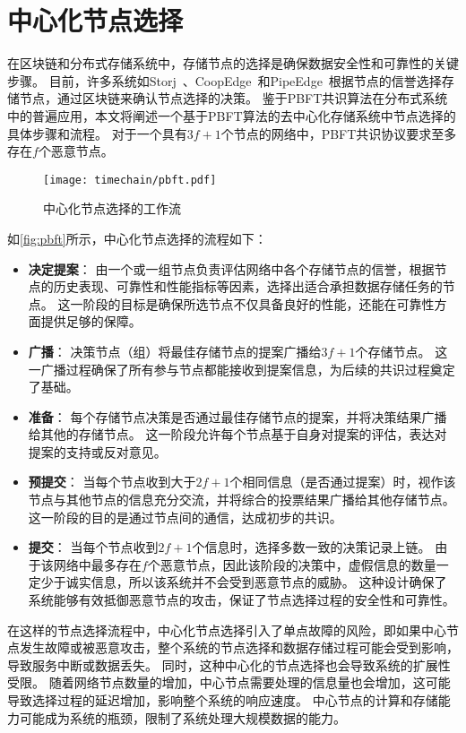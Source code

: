 \section{中心化节点选择}
在区块链和分布式存储系统中，存储节点的选择是确保数据安全性和可靠性的关键步骤。
目前，许多系统如Storj~\cite{storj2018storj}、CoopEdge~\cite{yuan2021coopedge}和PipeEdge~\cite{yuan2023pipeedge}根据节点的信誉选择存储节点，通过区块链来确认节点选择的决策。
鉴于PBFT共识算法在分布式系统中的普遍应用，本文将阐述一个基于PBFT算法的去中心化存储系统中节点选择的具体步骤和流程。
对于一个具有$3f+1$个节点的网络中，PBFT共识协议要求至多存在$f$个恶意节点。

\begin{figure}[t]
    \centering
    \texttt{[image: timechain/pbft.pdf]}
    \caption{中心化节点选择的工作流}
    \label{fig:pbft}
\end{figure}

如\autoref{fig:pbft}所示，中心化节点选择的流程如下：
\begin{itemize}
    \item \textbf{决定提案}：
    由一个或一组节点负责评估网络中各个存储节点的信誉，根据节点的历史表现、可靠性和性能指标等因素，选择出适合承担数据存储任务的节点。
    这一阶段的目标是确保所选节点不仅具备良好的性能，还能在可靠性方面提供足够的保障。
    \item \textbf{广播}：
    决策节点（组）将最佳存储节点的提案广播给$3f+1$个存储节点。
    这一广播过程确保了所有参与节点都能接收到提案信息，为后续的共识过程奠定了基础。
    \item \textbf{准备}：
    每个存储节点决策是否通过最佳存储节点的提案，并将决策结果广播给其他的存储节点。
    这一阶段允许每个节点基于自身对提案的评估，表达对提案的支持或反对意见。
    \item \textbf{预提交}：
    当每个节点收到大于$2f+1$个相同信息（是否通过提案）时，视作该节点与其他节点的信息充分交流，并将综合的投票结果广播给其他存储节点。
    这一阶段的目的是通过节点间的通信，达成初步的共识。
    \item \textbf{提交}：
    当每个节点收到$2f+1$个信息时，选择多数一致的决策记录上链。
    由于该网络中最多存在$f$个恶意节点，因此该阶段的决策中，虚假信息的数量一定少于诚实信息，所以该系统并不会受到恶意节点的威胁。
    这种设计确保了系统能够有效抵御恶意节点的攻击，保证了节点选择过程的安全性和可靠性。
\end{itemize}

在这样的节点选择流程中，中心化节点选择引入了单点故障的风险，即如果中心节点发生故障或被恶意攻击，整个系统的节点选择和数据存储过程可能会受到影响，导致服务中断或数据丢失。
同时，这种中心化的节点选择也会导致系统的扩展性受限。
随着网络节点数量的增加，中心节点需要处理的信息量也会增加，这可能导致选择过程的延迟增加，影响整个系统的响应速度。
中心节点的计算和存储能力可能成为系统的瓶颈，限制了系统处理大规模数据的能力。

